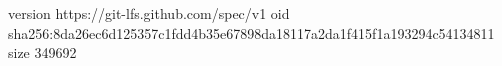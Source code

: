 version https://git-lfs.github.com/spec/v1
oid sha256:8da26ec6d125357c1fdd4b35e67898da18117a2da1f415f1a193294c54134811
size 349692
